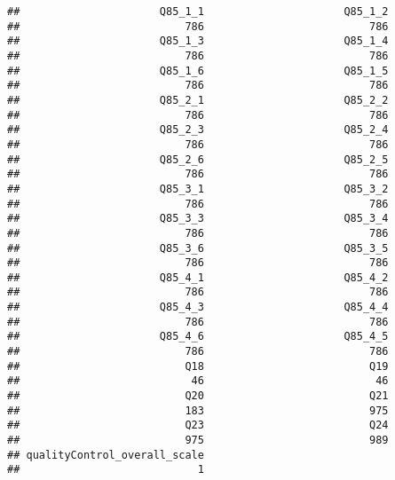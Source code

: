 \documentclass[]{article}
\newenvironment{Shaded}{\begin{snugshade}}{\end{snugshade}}
\newcommand{\KeywordTok}[1]{\textcolor[rgb]{0.13,0.29,0.53}{\textbf{{#1}}}}
\newcommand{\DecValTok}[1]{\textcolor[rgb]{0.00,0.00,0.81}{{#1}}}
\newcommand{\StringTok}[1]{\textcolor[rgb]{0.31,0.60,0.02}{{#1}}}
\newcommand{\NormalTok}[1]{{#1}}
\begin{document}
\begin{verbatim}
##                      Q85_1_1                      Q85_1_2 
##                          786                          786 
##                      Q85_1_3                      Q85_1_4 
##                          786                          786 
##                      Q85_1_6                      Q85_1_5 
##                          786                          786 
##                      Q85_2_1                      Q85_2_2 
##                          786                          786 
##                      Q85_2_3                      Q85_2_4 
##                          786                          786 
##                      Q85_2_6                      Q85_2_5 
##                          786                          786 
##                      Q85_3_1                      Q85_3_2 
##                          786                          786 
##                      Q85_3_3                      Q85_3_4 
##                          786                          786 
##                      Q85_3_6                      Q85_3_5 
##                          786                          786 
##                      Q85_4_1                      Q85_4_2 
##                          786                          786 
##                      Q85_4_3                      Q85_4_4 
##                          786                          786 
##                      Q85_4_6                      Q85_4_5 
##                          786                          786 
##                          Q18                          Q19 
##                           46                           46 
##                          Q20                          Q21 
##                          183                          975 
##                          Q23                          Q24 
##                          975                          989 
## qualityControl_overall_scale 
##                            1
\end{verbatim}

\begin{Shaded}
\end{Shaded}
\end{document}
